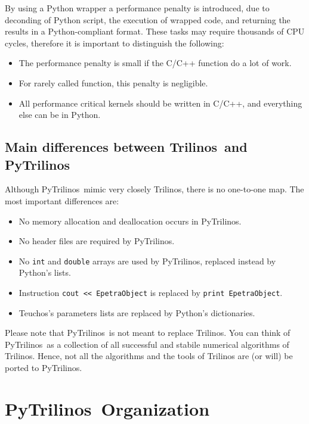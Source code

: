 \documentclass[10pt,relax]{SANDreport}
\newcommand{\PyTrilinos}{{PyTrilinos}}
\newcommand{\trilinos}{{Trilinos}}
\newcommand{\teuchos}{{Teuchos}}
\begin{document}
By using a Python wrapper a performance penalty is introduced, due to
deconding of Python script, the execution of wrapped code, and returning the
results in a Python-compliant format. These tasks may require thousands of CPU
cycles, therefore it is important to distinguish the following:
\begin{itemize}
\item The performance penalty is small if the C/C++ function do a lot of work.
\item For rarely called function, this penalty is negligible.
\item All performance critical kernels should be written in C/C++, and
everything else can be in Python.
\end{itemize}

\subsection{Main differences between \trilinos\ and \PyTrilinos}
\label{sec:differences}

Although \PyTrilinos\ mimic very closely \trilinos, there is no one-to-one
map. The most important differences are:
\begin{itemize}
\item No memory allocation and deallocation occurs in \PyTrilinos.
\item No header files are required by \PyTrilinos.
\item No {\tt int} and {\tt double} arrays are used by \PyTrilinos, replaced instead by
Python's lists.
\item Instruction \verb!cout << EpetraObject! is replaced by \verb!print EpetraObject!.
\item \teuchos's parameters lists are replaced by Python's dictionaries.
\end{itemize}

Please note that \PyTrilinos\ is not meant to replace Trilinos. You can think
of \PyTrilinos\ as a collection of all successful and stabile numerical
algorithms of Trilinos.  Hence, not all the algorithms and the tools of Trilinos are 
(or will) be ported to \PyTrilinos. 

\section{\PyTrilinos\ Organization}
\label{sec:organization}
\end{document}
